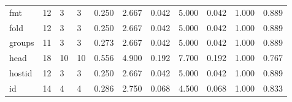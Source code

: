 \begin{longtable}{lp{1.8cm}p{1.8cm}p{1.8cm}p{1.8cm}p{1.8cm}p{1.8cm}p{1.8cm}p{1.8cm}p{1.8cm}p{1.8cm}}
fmt       &                           12 &                  3 &                                 3 &                                      0.250 &                                  2.667 &                                        0.042 &                             5.000 &                                   0.042 &                              1.000 &                                              0.889 \\
fold      &                           12 &                  3 &                                 3 &                                      0.250 &                                  2.667 &                                        0.042 &                             5.000 &                                   0.042 &                              1.000 &                                              0.889 \\
groups    &                           11 &                  3 &                                 3 &                                      0.273 &                                  2.667 &                                        0.042 &                             5.000 &                                   0.042 &                              1.000 &                                              0.889 \\
head      &                           18 &                 10 &                                10 &                                      0.556 &                                  4.900 &                                        0.192 &                             7.700 &                                   0.192 &                              1.000 &                                              0.767 \\
hostid    &                           12 &                  3 &                                 3 &                                      0.250 &                                  2.667 &                                        0.042 &                             5.000 &                                   0.042 &                              1.000 &                                              0.889 \\
id        &                           14 &                  4 &                                 4 &                                      0.286 &                                  2.750 &                                        0.068 &                             4.500 &                                   0.068 &                              1.000 &                                              0.833 \\

\end{longtable}
